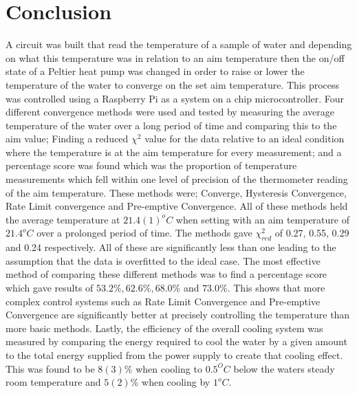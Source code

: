 \documentclass[10pt]{article}
\begin{document}
\section*{Conclusion}
A circuit was built that read the temperature of a sample of water and depending on what this temperature was in relation to an aim temperature then the on/off state of a Peltier heat pump was changed in order to raise or lower the temperature of the water to converge on the set aim temperature. This process was controlled using a Raspberry Pi as a system on a chip microcontroller. Four different convergence methods were used and tested by measuring the average temperature of the water over a long period of time and comparing this to the aim value; Finding a reduced $\chi^2$ value for the data relative to an ideal condition where the temperature is at the aim temperature for every measurement; and a percentage score was found which was the proportion of temperature measurements which fell within one level of precision of the thermometer reading of the aim temperature. These methods were; Converge, Hysteresis Convergence, Rate Limit convergence and Pre-emptive Convergence. All of these methods held the average temperature at $21.4(1)^oC$ when setting with an aim temperature of $21.4^oC$ over a prolonged period of time. The methods gave $\chi^2_{red}$ of 0.27, 0.55, 0.29 and 0.24 respectively. All of these are significantly less than one leading to the assumption that the data is overfitted to the ideal case. The most effective method of comparing these different methods was to find a percentage score which gave results of $53.2\%, 62.6\%, 68.0\%$ and $73.0\%$. This shows that more complex control systems such as Rate Limit Convergence and Pre-emptive Convergence are significantly better at precisely controlling the temperature than more basic methods. Lastly, the efficiency of the overall cooling system was measured by comparing the energy required to cool the water by a given amount to the total energy supplied from the power supply to create that cooling effect. This was found to be $8(3)\%$ when cooling to $0.5^OC$ below the waters steady room temperature and $5(2)\%$ when cooling by $1^oC$. 






\newpage
\appendix
\end{document}
